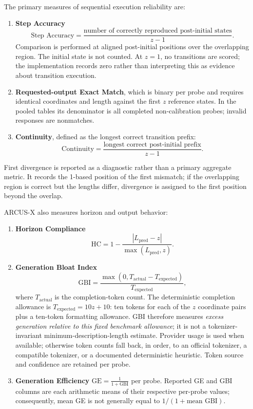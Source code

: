 \documentclass{article}
\begin{document}
The primary measures of sequential execution reliability are:
\begin{enumerate}
    \item \textbf{Step Accuracy}
    \[
    \text{Step Accuracy} =
    \frac{\text{number of correctly reproduced post-initial states}}
    {z-1}.
    \]
    Comparison is performed at aligned post-initial positions over the
    overlapping region. The initial state is not counted. At $z=1$,
    no transitions are scored; the implementation records zero rather
    than interpreting this as evidence about transition execution.

    \item \textbf{Requested-output Exact Match}, which is binary per probe and requires identical coordinates and length against the first $z$ reference states. In the pooled tables its denominator is all completed non-calibration probes; invalid responses are nonmatches.

    \item \textbf{Continuity}, defined as the longest correct transition
    prefix:
    \[
    \text{Continuity} =
    \frac{\text{longest correct post-initial prefix}}
    {z-1}.
    \]
\end{enumerate}

First divergence is reported as a diagnostic rather than a primary aggregate metric. It records the 1-based position of the first mismatch; if the overlapping region is correct but the lengths differ, divergence is assigned to the first position beyond the overlap.

ARCUS-X also measures horizon and output behavior:
\begin{enumerate}
    \item \textbf{Horizon Compliance}
    \[
    \text{HC} =
    1 -
    \frac{\left|L_{\mathrm{pred}}-z\right|}
    {\max(L_{\mathrm{pred}},z)}.
    \]

    \item \textbf{Generation Bloat Index}
    \[
    \text{GBI} =
    \frac{\max(0,T_{\mathrm{actual}}-T_{\mathrm{expected}})}
    {T_{\mathrm{expected}}},
    \]
    where $T_{\mathrm{actual}}$ is the completion-token count. The deterministic completion allowance is $T_{\mathrm{expected}}=10z+10$: ten tokens for each of the $z$ coordinate pairs plus a ten-token formatting allowance. GBI therefore measures \emph{excess generation relative to this fixed benchmark allowance}; it is not a tokenizer-invariant minimum-description-length estimate. Provider usage is used when available; otherwise token counts fall back, in order, to an official tokenizer, a compatible tokenizer, or a documented deterministic heuristic. Token source and confidence are retained per probe.

    \item \textbf{Generation Efficiency}
    $\text{GE} = \frac{1}{1+\text{GBI}}$ per probe. Reported GE and GBI columns are each arithmetic means of their respective per-probe values; consequently, mean GE is not generally equal to $1/(1+\text{mean GBI})$.
\end{enumerate}
\end{document}
